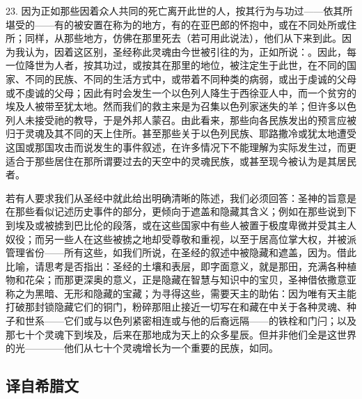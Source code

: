 23. 因为正如那些因着众人共同的死亡离开此世的人，按其行为与功过——依其所堪受的——有的被安置在称为的地方，有的在亚巴郎的怀抱中，或在不同处所或住所；同样，从那些地方，仿佛在那里死去（若可用此说法），他们从下来到此。因为我认为，因着这区别，圣经称此灵魂由今世被引往的为，正如所说：。因此，每一位降世为人者，按其功过，或按其在那里的地位，被注定生于此世，在不同的国家、不同的民族、不同的生活方式中，或带着不同种类的病弱，或出于虔诚的父母或不虔诚的父母；因此有时会发生一个以色列人降生于西徐亚人中，而一个贫穷的埃及人被带至犹太地。然而我们的救主来是为召集以色列家迷失的羊；但许多以色列人未接受祂的教导，于是外邦人蒙召。由此看来，那些向各民族发出的预言应被归于灵魂及其不同的天上住所。甚至那些关于以色列民族、耶路撒冷或犹太地遭受这国或那国攻击而说发生的事件叙述，在许多情况下不能理解为实际发生过，而更适合于那些居住在那所谓要过去的天空中的灵魂民族，或甚至现今被认为是其居民者。\par

若有人要求我们从圣经中就此给出明确清晰的陈述，我们必须回答：圣神的旨意是在那些看似记述历史事件的部分，更倾向于遮盖和隐藏其含义；例如在那些说到下到埃及或被掳到巴比伦的段落，或在这些国家中有些人被置于极度卑微并受其主人奴役；而另一些人在这些被掳之地却受尊敬和重视，以至于居高位掌大权，并被派管理省份——所有这些，如我们所说，在圣经的叙述中被隐藏和遮盖，因为。借此比喻，请思考是否指出：圣经的土壤和表层，即字面意义，就是那田，充满各种植物和花朵；而那更深奥的意义，正是隐藏在智慧与知识中的宝贝，圣神借依撒意亚称之为黑暗、无形和隐藏的宝藏；为寻得这些，需要天主的助佑：因为唯有天主能打破那封锁隐藏它们的铜门，粉碎那阻止接近一切写在和藏在中关于各种灵魂、种子和世系——它们或与以色列紧密相连或与他的后裔远隔——的铁栓和门闩；以及那七十个灵魂下到埃及，后来在那地成为天上的众多星辰。但并非他们全是这世界的光————他们从七十个灵魂增长为一个重要的民族，如同。\par


\subsection{译自希腊文}

\par

